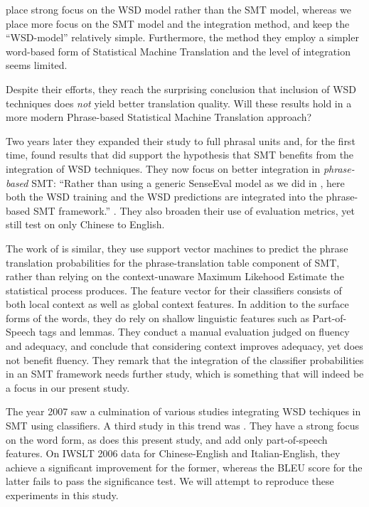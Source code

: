 \documentclass[11pt]{article}
\theoremstyle{break}
\begin{document}
\cite{CarpuatWu05} place strong focus on the WSD model rather than the SMT
model, whereas we place more focus on the SMT model and the integration method,
and keep the ``WSD-model'' relatively simple. Furthermore, the method they
employ a simpler word-based form of Statistical Machine Translation and the
level of integration seems limited.

Despite their efforts, they reach the surprising conclusion that inclusion of
WSD techniques does \emph{not} yield better translation quality. Will these
results hold in a more modern Phrase-based Statistical Machine Translation
approach?

Two years later they expanded their study to full phrasal units
\citep{CarpuatWu07} and, for the first time, found results that did support the
hypothesis that SMT benefits from the integration of WSD techniques. They now
focus on better integration in \emph{phrase-based} SMT: ``Rather than using a
generic SenseEval model as we did in \cite{CarpuatWu05}, here both the WSD
training and the WSD predictions are integrated into the phrase-based SMT
framework.'' \citep{CarpuatWu07}. They also broaden their use of evaluation
metrics, yet still test on only Chinese to English.

The work of \cite{Gimenez+07} is similar, they use support vector machines to
predict the phrase translation probabilities for the phrase-translation table
component of SMT, rather than relying on the context-unaware Maximum Likehood
Estimate the statistical process produces. The feature vector for their
classifiers consists of both local context as well as global context features.
In addition to the surface forms of the words, they do rely on shallow
linguistic features such as Part-of-Speech tags and lemmas. They conduct a
manual evaluation judged on fluency and adequacy, and conclude that considering
context improves adequacy, yet does not benefit fluency. They remark that the
integration of the classifier probabilities in an SMT framework needs further
study, which is something that will indeed be a focus in our present study.

The year 2007 saw a culmination of various studies integrating WSD techiques in
SMT using classifiers. A third study in this trend was \cite{Stroppa+07}. They
have a strong focus on the word form, as does this present study, and add only
part-of-speech features. On IWSLT 2006 data for Chinese-English and
Italian-English, they achieve a significant improvement for the former, whereas
the BLEU score for the latter fails to pass the significance test. We will
attempt to reproduce these experiments in this study.
\end{document}
